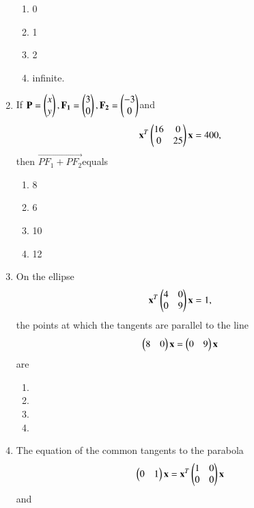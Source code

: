 \begin{enumerate}[label=\arabic*.,ref=\thesubsection.\theenumi]
    \begin{enumerate}
    \item 0
    \item 1
    \item 2
    \item infinite.
    \end{enumerate}
    \item If $\mathbf{P}=\begin{pmatrix}x\\y\end{pmatrix}, \mathbf{F_1}=\begin{pmatrix}3\\0\end{pmatrix}, \mathbf{F_2}=\begin{pmatrix}-3\\0\end{pmatrix}$and
    \begin{align}
    \mathbf{x}^T\begin{pmatrix}16& 0 \\0 & 25\end{pmatrix} \mathbf{x}=400,\end{align}then $\vec{PF_1+PF_2} $equals 
    \begin{enumerate}
    \item 8
    \item 6
    \item 10
    \item 12
    \end{enumerate}
    \item On the ellipse
    \begin{align} 
    \mathbf{x}^T\begin{pmatrix}4& 0 \\0 & 9\end{pmatrix} \mathbf{x}=1,
    \end{align} the points at which the tangents are parallel to the line 
    \begin{align}
    \begin{pmatrix}8&0\end{pmatrix}\mathbf{x}=\begin{pmatrix}0&9\end{pmatrix}\mathbf{x}
    \end{align} are 
    \begin{enumerate}
    \item {}
    \item {}
    \item {}
    \item {}
    \end{enumerate}
    \item The equation of the common tangents to the parabola 
    \begin{align}
    \begin{pmatrix}0&1\end{pmatrix}\mathbf{x}= \mathbf{x}^T\begin{pmatrix}1& 0 \\0 & 0\end{pmatrix} \mathbf{x} 
    \end{align} and 
    \begin{align}

\end{align}
\end{enumerate}

